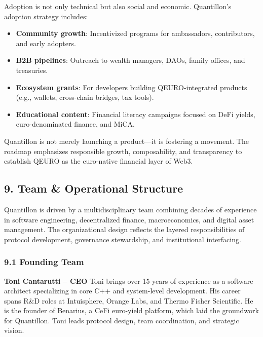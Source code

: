 Adoption is not only technical but also social and economic.
Quantillon's adoption strategy includes:

\begin{itemize}
\item
  \textbf{Community growth}: Incentivized programs for ambassadors,
  contributors, and early adopters.
\item
  \textbf{B2B pipelines}: Outreach to wealth managers, DAOs, family
  offices, and treasuries.
\item
  \textbf{Ecosystem grants}: For developers building QEURO-integrated
  products (e.g., wallets, cross-chain bridges, tax tools).
\item
  \textbf{Educational content}: Financial literacy campaigns focused on
  DeFi yields, euro-denominated finance, and MiCA.
\end{itemize}

Quantillon is not merely launching a product---it is fostering a
movement. The roadmap emphasizes responsible growth, composability, and
transparency to establish QEURO as the euro-native financial layer of
Web3.

\hypertarget{team-operational-structure}{%
\subsection{9. Team \& Operational
Structure}\label{team-operational-structure}}

Quantillon is driven by a multidisciplinary team combining decades of
experience in software engineering, decentralized finance,
macroeconomics, and digital asset management. The organizational design
reflects the layered responsibilities of protocol development,
governance stewardship, and institutional interfacing.

\hypertarget{founding-team}{%
\subsubsection{9.1 Founding Team}\label{founding-team}}

\textbf{Toni Cantarutti -- CEO} Toni brings over 15 years of experience
as a software architect specializing in core C++ and system-level
development. His career spans R\&D roles at Intuisphere, Orange Labs,
and Thermo Fisher Scientific. He is the founder of Benarius, a CeFi
euro-yield platform, which laid the groundwork for Quantillon. Toni
leads protocol design, team coordination, and strategic vision.

